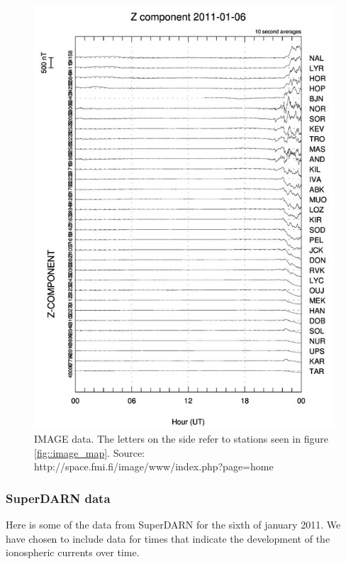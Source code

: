 \documentclass[norsk,a4paper,12pt]{article}
\begin{document}
\begin{figure}[H]
\includegraphics[scale = 0.9]{Figures/Z_gram.jpg}
\centering
\caption{IMAGE data. The letters on the side refer to stations seen in figure \ref{fig::image_map}. Source: http://space.fmi.fi/image/www/index.php?page=home }
\label{fig::image_data}
\end{figure}

\subsubsection{SuperDARN data}
Here is some of the data from SuperDARN for the sixth of january 2011. We have chosen to include data for times that indicate the development of the ionospheric currents over time. 
\end{document}
